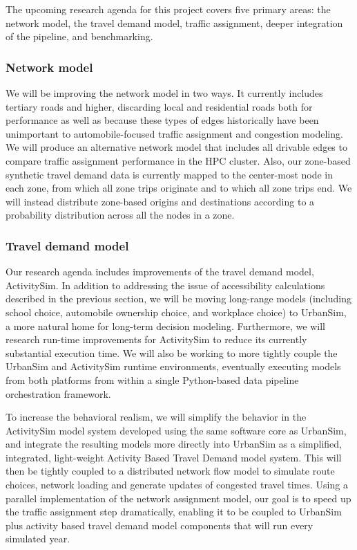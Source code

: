 The upcoming research agenda for this project covers five primary areas: the network model, the travel demand model, traffic assignment, deeper integration of the pipeline, and benchmarking.

\subsubsection{Network model}

We will be improving the network model in two ways. It currently includes tertiary roads and higher, discarding local and residential roads both for performance as well as because these types of edges historically have been unimportant to automobile-focused traffic assignment and congestion modeling. We will produce an alternative network model that includes all drivable edges to compare traffic assignment performance in the HPC cluster. Also, our zone-based synthetic travel demand data is currently mapped to the center-most node in each zone, from which all zone trips originate and to which all zone trips end. We will instead distribute zone-based origins and destinations according to a probability distribution across all the nodes in a zone.

\subsubsection{Travel demand model}

Our research agenda includes improvements of the travel demand model, ActivitySim. In addition to addressing the issue of accessibility calculations described in the previous section, we will be moving long-range models (including school choice, automobile ownership choice, and workplace choice) to UrbanSim, a more natural home for long-term decision modeling. Furthermore, we will research run-time improvements for ActivitySim to reduce its currently substantial execution time. We will also be working to more tightly couple the UrbanSim and ActivitySim runtime environments, eventually executing models from both platforms from within a single Python-based data pipeline orchestration framework. 

To increase the behavioral realism, we will simplify the behavior in the ActivitySim model system developed using the same software core as UrbanSim, and integrate the resulting models more directly into UrbanSim as a simplified, integrated, light-weight Activity Based Travel Demand model system. This will then be tightly coupled to a distributed network flow model to simulate route choices, network loading and generate updates of congested travel times. Using a parallel implementation of the network assignment model, our goal is to speed up the traffic assignment step dramatically, enabling it to be coupled to UrbanSim plus activity based travel demand model components that will run every simulated year.

